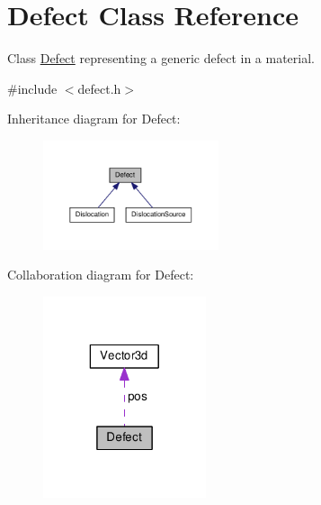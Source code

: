 \hypertarget{classDefect}{\section{Defect Class Reference}
\label{d5/d4f/classDefect}
}


Class \hyperlink{classDefect}{Defect} representing a generic defect in a material.  




{\ttfamily \#include $<$defect.\-h$>$}



Inheritance diagram for Defect\-:
\nopagebreak
\begin{figure}[H]
\begin{center}
\leavevmode
\includegraphics[width=146pt]{de/d48/classDefect__inherit__graph}
\end{center}
\end{figure}


Collaboration diagram for Defect\-:
\nopagebreak
\begin{figure}[H]
\begin{center}
\leavevmode
\includegraphics[width=136pt]{d7/d09/classDefect__coll__graph}
\end{center}
\end{figure}
